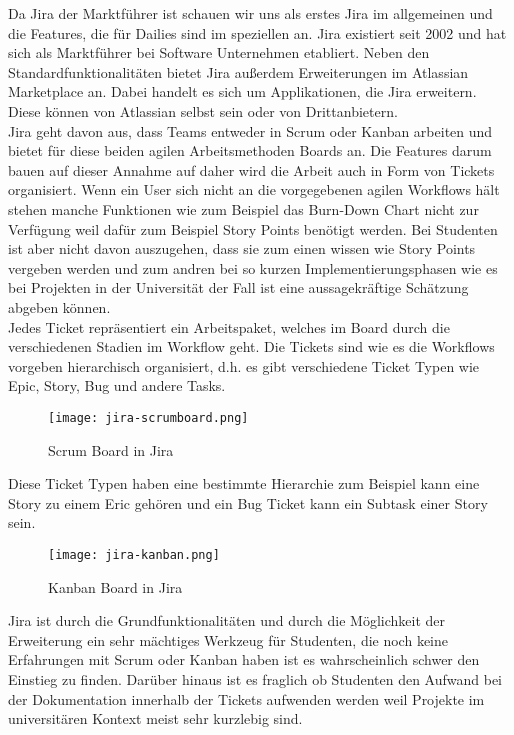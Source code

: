 Da Jira der Marktführer ist schauen wir uns als erstes Jira im allgemeinen und die Features, die für Dailies sind im speziellen an. Jira existiert seit 2002 und hat sich als Marktführer bei Software Unternehmen etabliert. Neben den Standardfunktionalitäten bietet Jira außerdem Erweiterungen im Atlassian Marketplace an. Dabei handelt es sich um Applikationen, die Jira erweitern. Diese können von Atlassian selbst sein oder von Drittanbietern.\\
Jira geht davon aus, dass Teams entweder in Scrum oder Kanban arbeiten und bietet für diese beiden agilen Arbeitsmethoden Boards an. Die Features darum bauen auf dieser Annahme auf daher wird die Arbeit auch in Form von Tickets organisiert. Wenn ein User sich nicht an die vorgegebenen agilen Workflows hält stehen manche Funktionen wie zum Beispiel das Burn-Down Chart nicht zur Verfügung weil dafür zum Beispiel Story Points benötigt werden. Bei Studenten ist aber nicht davon auszugehen, dass sie zum einen wissen wie Story Points vergeben werden und zum andren bei so kurzen Implementierungsphasen wie es bei Projekten in der Universität der Fall ist eine aussagekräftige Schätzung abgeben können. \\
Jedes Ticket repräsentiert ein Arbeitspaket, welches im Board durch die verschiedenen Stadien im Workflow geht. Die Tickets sind wie es die Workflows vorgeben hierarchisch organisiert, d.h. es gibt verschiedene Ticket Typen wie Epic, Story, Bug und andere Tasks.

\begin{figure}[H]
	\centering
	\texttt{[image: jira-scrumboard.png]}
    \caption{Scrum Board in Jira}
	\label{fig:scrumboardjira}
\end{figure}

Diese Ticket Typen haben eine bestimmte Hierarchie zum Beispiel kann eine Story zu einem Eric gehören und ein Bug Ticket kann ein Subtask einer Story sein. 

\begin{figure}[H]
	\centering
	\texttt{[image: jira-kanban.png]}
    \caption{Kanban Board in Jira}
	\label{fig:kanbanjira}
\end{figure}

Jira ist durch die Grundfunktionalitäten und durch die Möglichkeit der Erweiterung ein sehr mächtiges Werkzeug für Studenten, die noch keine Erfahrungen mit Scrum oder Kanban haben ist es wahrscheinlich schwer den Einstieg zu finden.  Darüber hinaus ist es fraglich ob Studenten den Aufwand bei der Dokumentation innerhalb der Tickets aufwenden werden weil Projekte im universitären Kontext meist sehr kurzlebig sind.  

